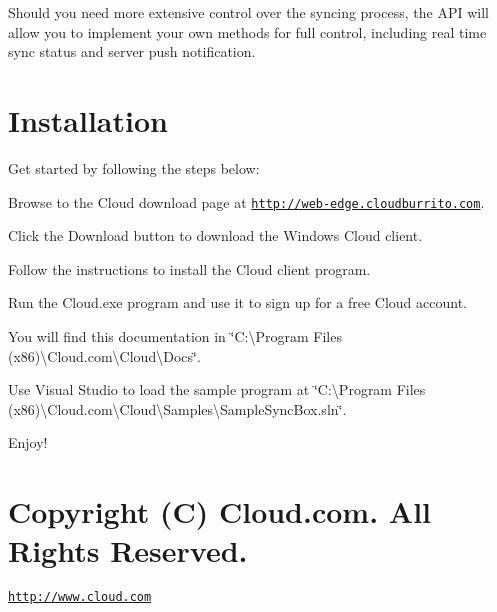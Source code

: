 Should you need more extensive control over the syncing process, the A\-P\-I will allow you to implement your own methods for full control, including real time sync status and server push notification.\hypertarget{index_install_sec}{}\section{Installation}\label{index_install_sec}
Get started by following the steps below\-:
\begin{DoxyItemize}
\item Browse to the Cloud download page at \href{http://web-edge.cloudburrito.com}{\tt http\-://web-\/edge.\-cloudburrito.\-com}.
\item Click the Download button to download the Windows Cloud client.
\item Follow the instructions to install the Cloud client program.
\item Run the Cloud.\-exe program and use it to sign up for a free Cloud account.
\item You will find this documentation in \char`\"{}\-C\-:\textbackslash{}\-Program Files (x86)\textbackslash{}\-Cloud.\-com\textbackslash{}\-Cloud\textbackslash{}\-Docs\char`\"{}.
\item Use Visual Studio to load the sample program at \char`\"{}\-C\-:\textbackslash{}\-Program Files (x86)\textbackslash{}\-Cloud.\-com\textbackslash{}\-Cloud\textbackslash{}\-Samples\textbackslash{}\-Sample\-Sync\-Box.\-sln\char`\"{}.
\item Enjoy!
\end{DoxyItemize}\hypertarget{index_copyright_sec}{}\section{Copyright (\-C) Cloud.\-com.  All Rights Reserved.}\label{index_copyright_sec}
\href{http://www.cloud.com}{\tt http\-://www.\-cloud.\-com} 